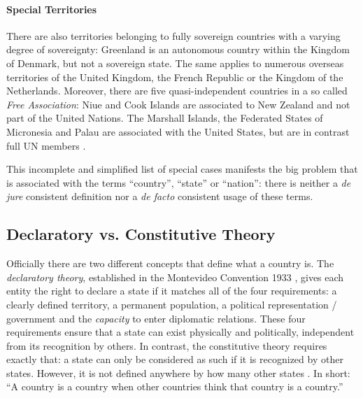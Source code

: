 \paragraph{Special Territories} %
\label{par:special_territories}

There are also territories belonging to fully sovereign countries with a varying degree of sovereignty: Greenland is an autonomous country within the Kingdom of Denmark, but not a sovereign state. The same applies to numerous overseas territories of the United Kingdom, the French Republic or the Kingdom of the Netherlands. Moreover, there are five quasi-independent countries in a so called \emph{Free Association}: Niue and Cook Islands are associated to New Zealand and not part of the United Nations. The Marshall Islands, the Federated States of Micronesia and Palau are associated with the United States, but are in contrast full UN members \cite{SpecialTerritories}.


This incomplete and simplified list of special cases manifests the big problem that is associated with the terms ``country'', ``state'' or ``nation'': there is neither a \emph{de jure} consistent definition nor a \emph{de facto} consistent usage of these terms.


\subsection{Declaratory vs. Constitutive Theory} %
\label{sub:declaratory_vs_constitutive_theory}

Officially there are two different concepts that define what a country is. The \emph{declaratory theory}, established in the Montevideo Convention 1933 \cite{MontevideoConvention}, gives each entity the right to declare a state if it matches all of the four requirements: a clearly defined territory, a permanent population, a political representation / government and the \emph{capacity} to enter diplomatic relations. These four requirements ensure that a state can exist physically and politically, independent from its recognition by others.
In contrast, the constitutive theory requires exactly that: a state can only be considered as such if it is recognized by other states. However, it is not defined anywhere by how many other states \cite{StateTheory}. In short: ``A country is a country when other countries think that country is a country.'' \cite{greyCountries}

